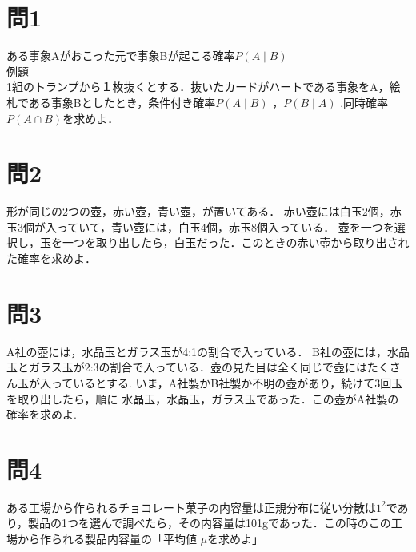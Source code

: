 \documentclass[11pt,a4paper]{jsarticle}
\begin{document}
%
%
\section*{問1}
ある事象Aがおこった元で事象Bが起こる確率$ P(A  \mid  B) $\\
 例題\\
 1組のトランプから１枚抜くとする．抜いたカードがハートである事象をA，絵札である事象Bとしたとき，条件付き確率$ P(A  \mid  B) $ ，$ P(B  \mid A ) $ ,同時確率$  P(A \cap B) $を求めよ．
\section*{問2}
形が同じの2つの壺，赤い壺，青い壺，が置いてある．
赤い壺には白玉2個，赤玉3個が入っていて，青い壺には，白玉4個，赤玉8個入っている．
壺を一つを選択し，玉を一つを取り出したら，白玉だった．このときの赤い壺から取り出された確率を求めよ．
\section*{問3}
A社の壺には，水晶玉とガラス玉が4:1の割合で入っている．
B社の壺には，水晶玉とガラス玉が2:3の割合で入っている．壺の見た目は全く同じで壺にはたくさん玉が入っているとする.
いま，A社製かB社製か不明の壺があり，続けて3回玉を取り出したら，順に 水晶玉，水晶玉，ガラス玉であった．この壺がA社製の確率を求めよ.
\section*{問4}
ある工場から作られるチョコレート菓子の内容量は正規分布に従い分散は$ 1^2$であり，製品の1つを選んで調べたら，その内容量は101gであった．この時のこの工場から作られる製品内容量の「平均値 $\mu$を求めよ」
\end{document}
